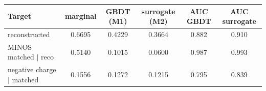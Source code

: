 \begin{tabular}{lccccc}
\toprule
Target & marginal & GBDT (M1) & surrogate (M2) & AUC GBDT & AUC surrogate \\
\midrule
reconstructed & 0.6695 & 0.4229 & 0.3664 & 0.882 & 0.910 \\
MINOS matched $\mid$ reco & 0.5140 & 0.1015 & 0.0600 & 0.987 & 0.993 \\
negative charge $\mid$ matched & 0.1556 & 0.1272 & 0.1215 & 0.795 & 0.839 \\
\bottomrule
\end{tabular}
